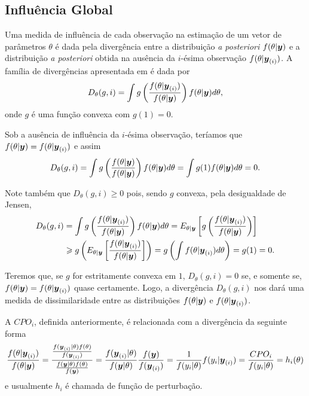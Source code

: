 \subsection{Influência Global}

Uma medida de influência de cada observação na estimação de um vetor de parâmetros $\theta$ é dada pela divergência entre a distribuição \textit{a posteriori} $f(\theta|{\boldsymbol{y}})$ e a distribuição \textit{a posteriori} obtida na ausência da $i$-ésima observação $f(\theta|{\boldsymbol{y}_{(i)}})$. A família de divergências apresentada em \citet{Weiss1996} é dada por
\begin{equation}\label{eq:def_div}
D_\theta(g,i)=\int g\left(\frac{f(\theta|{\boldsymbol{y}_{(i)}})}{f(\theta|{\boldsymbol{y}})}\right)f(\theta|{\boldsymbol{y}}) d\theta,
\end{equation}
onde $g$ é uma função convexa com $g(1)=0$.

Sob a ausência de influência da $i$-ésima observação, teríamos que $f(\theta|{\boldsymbol{y}})=f(\theta|{\boldsymbol{y}_{(i)}})$ e assim
\begin{equation}
D_\theta(g,i)=\int g\left(\frac{f(\theta|{\boldsymbol{y}})}{f(\theta|{\boldsymbol{y}})}\right)f(\theta|{\boldsymbol{y}}) d\theta =\int g(1)f(\theta|{\boldsymbol{y}}) d\theta =  0.
\end{equation}

Note também que $D_\theta(g,i) \geqslant 0$ pois, sendo $g$ convexa, pela desigualdade de Jensen,
\begin{equation}
\begin{split}
D_\theta(g,i)&=\int g\left(\frac{f(\theta|{\boldsymbol{y}_{(i)}})}{f(\theta|{\boldsymbol{y}})}\right)f(\theta|{\boldsymbol{y}}) d\theta = E_{\theta|{\boldsymbol{y}}}\left[g\left(\frac{f(\theta|{\boldsymbol{y}_{(i)}})}{f(\theta|{\boldsymbol{y}})}\right)\right] \\
{} & \geqslant g\left(E_{\theta|{\boldsymbol{y}}}\left[\frac{f(\theta|{\boldsymbol{y}_{(i)}})}{f(\theta|{\boldsymbol{y}})}\right]\right) = g\left(\int f(\theta|{\boldsymbol{y}_{(i)}})d\theta\right) = g(1) =0.
\end{split}
\end{equation}

Teremos que, se $g$ for estritamente convexa em $1$, $D_\theta(g,i) = 0$ se, e somente se, $f(\theta|{\boldsymbol{y}})=f(\theta|{\boldsymbol{y}_{(i)}})$ quase certamente. Logo, a divergência $D_\theta(g,i)$ nos dará uma medida de dissimilaridade entre as distribuições $f(\theta|{\boldsymbol{y}})$ e $f(\theta|{\boldsymbol{y}_{(i)}})$.

A $CPO_i$, definida anteriormente, é relacionada com a divergência da seguinte forma
\begin{equation}
\frac{f(\theta|{\boldsymbol{y}_{(i)}})}{f(\theta|{\boldsymbol{y}})} = \frac{\frac{f({\boldsymbol{y}_{(i)}}|\theta)f(\theta)}{f({\boldsymbol{y}_{(i)}})}}{\frac{f({\boldsymbol{y}}|\theta)f(\theta)}{f({\boldsymbol{y}})}} = \frac{f({\boldsymbol{y}_{(i)}}|\theta)}{f({\boldsymbol{y}}|\theta)}\frac{f({\boldsymbol{y}})}{f({\boldsymbol{y}_{(i)}})}=\frac{1}{f(y_i|\theta)}f(y_i|{\boldsymbol{y}_{(i)}}) = \frac{CPO_i}{f(y_i|\theta)} = h_i(\theta)
\end{equation}
e usualmente $h_i$ é chamada de função de perturbação.

